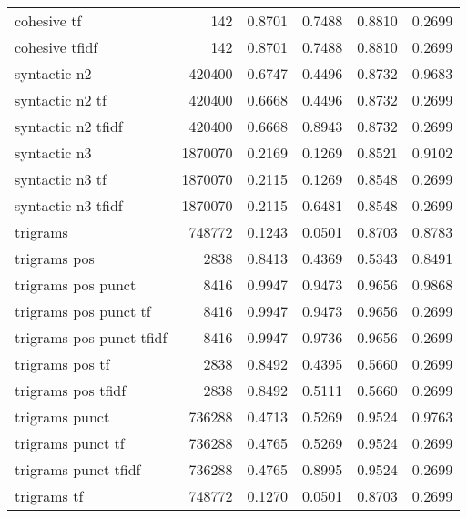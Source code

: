 \documentclass{article}
\begin{document}
\begin{table}
\begin{tabular}{lrrrrr}
cohesive tf                &     142 & 0.8701 &       0.7488 &         0.8810 &               0.2699 \\
cohesive tfidf             &     142 & 0.8701 &       0.7488 &         0.8810 &               0.2699 \\
syntactic n2               &  420400 & 0.6747 &       0.4496 &         0.8732 &               0.9683 \\
syntactic n2 tf            &  420400 & 0.6668 &       0.4496 &         0.8732 &               0.2699 \\
syntactic n2 tfidf         &  420400 & 0.6668 &       0.8943 &         0.8732 &               0.2699 \\
syntactic n3               & 1870070 & 0.2169 &       0.1269 &         0.8521 &               0.9102 \\
syntactic n3 tf            & 1870070 & 0.2115 &       0.1269 &         0.8548 &               0.2699 \\
syntactic n3 tfidf         & 1870070 & 0.2115 &       0.6481 &         0.8548 &               0.2699 \\
trigrams                   &  748772 & 0.1243 &       0.0501 &         0.8703 &               0.8783 \\
trigrams pos               &    2838 & 0.8413 &       0.4369 &         0.5343 &               0.8491 \\
trigrams pos punct         &    8416 & 0.9947 &       0.9473 &         0.9656 &               0.9868 \\
trigrams pos punct tf      &    8416 & 0.9947 &       0.9473 &         0.9656 &               0.2699 \\
trigrams pos punct tfidf   &    8416 & 0.9947 &       0.9736 &         0.9656 &               0.2699 \\
trigrams pos tf            &    2838 & 0.8492 &       0.4395 &         0.5660 &               0.2699 \\
trigrams pos tfidf         &    2838 & 0.8492 &       0.5111 &         0.5660 &               0.2699 \\
trigrams punct             &  736288 & 0.4713 &       0.5269 &         0.9524 &               0.9763 \\
trigrams punct tf          &  736288 & 0.4765 &       0.5269 &         0.9524 &               0.2699 \\
trigrams punct tfidf       &  736288 & 0.4765 &       0.8995 &         0.9524 &               0.2699 \\
trigrams tf                &  748772 & 0.1270 &       0.0501 &         0.8703 &               0.2699 \\

\end{tabular}
\end{table}
\end{document}
